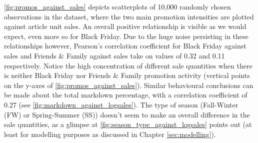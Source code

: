 \autoref{fig:promos_against_sales} depicts scatterplots of 10,000 randomly chosen observations in the dataset, where the two main promotion intensities are plotted against article unit sales. An overall positive relationship is visible as we would expect, even more so for Black Friday. Due to the huge noise persisting in these relationships however, Pearson's correlation coefficient for Black Friday against sales and Friends \& Family against sales take on values of 0.32 and 0.11 respectively. Notice the high concentration of different sale quantities when there is neither Black Friday nor Friends \& Family promotion activity (vertical points on the y-axes of \autoref{fig:promos_against_sales}). Similar behavioural conclusions can be made about the total markdown percentage, with a correlation coefficient of 0.27 (see \autoref{fig:markdown_against_logsales}). The type of season (Fall-Winter (FW) or Spring-Summer (SS)) doesn't seem to make an overall difference in the sale quantities, as a glimpse at \autoref{fig:season_type_against_logsales} points out (at least for modelling purposes as discussed in Chapter \ref{sec:modelling}). 
\\

